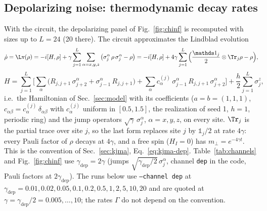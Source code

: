 \subsection{Depolarizing noise: thermodynamic decay rates}
\label{sec:floquet-dep}

With the circuit, the depolarizing panel of Fig.~\ref{fig:chinf} is recomputed with sizes up to $L = 24$ (20 there). The circuit approximates the Lindblad evolution
\begin{equation}
\dot\rho = \Lv(\rho) = -i[H,\rho] + \gamma\sum_{j=1}^{L}\sum_{\alpha = x,y,z}\big(\sigma^\alpha_j\,\rho\,\sigma^\alpha_j - \rho\big)
 = -i[H,\rho] + 4\gamma\sum_{j=1}^{L}\Big(\frac{\mathds 1_j}{2}\otimes\Tr_j\rho - \rho\Big),
\label{eq:floquet-dep}
\end{equation}
\begin{equation}
H = \sum_{j=1}^{L}\Big[\sum_{\alpha}\big(R_{j,j+1}\,\sigma^\alpha_{j+2} + \sigma^\alpha_{j-1}\,R_{j,j+1}\big) + \sum_{\alpha} c^{(j)}_{\alpha}\,\sigma^\alpha_{j-1}\,R_{j,j+1}\,\sigma^\alpha_{j+2}\Big] + \frac h2\sum_{j=1}^{L}\sigma^z_j ,
\label{eq:floquet-dep-H}
\end{equation}
i.e.\ the Hamiltonian of Sec.~\ref{sec:model} with its coefficients ($a = b = (1, 1, 1)$, $c_{\alpha\beta} = c^{(j)}_\alpha\,\delta_{\alpha\beta}$ with $c^{(j)}_\alpha$ uniform in $[0.5, 1.5]$, the realization of seed 1, $h = 1$, periodic ring) and the jump operators $\sqrt\gamma\,\sigma^\alpha_j$, $\alpha = x, y, z$, on every site. $\Tr_j$ is the partial trace over site $j$, so the last form replaces site $j$ by $\mathds 1_j/2$ at rate $4\gamma$: every Pauli factor of $\rho$ decays at $4\gamma$, and a free spin ($H_I = 0$) has $m_\perp = e^{-4\gamma t}$. This is the convention of Sec.~\ref{sec:kjma}, Eq.~\eqref{eq:kjma-dep}. Table~\ref{tab:channels} and Fig.~\ref{fig:chinf} use $\gamma_{\mathrm{dep}} = 2\gamma$ (jumps $\sqrt{\gamma_{\mathrm{dep}}/2}\,\sigma^\alpha_j$, channel \texttt{dep} in the code, Pauli factors at $2\gamma_{\mathrm{dep}}$). The runs below use \texttt{--channel dep} at $\gamma_{\mathrm{dep}} = 0.01, 0.02, 0.05, 0.1, 0.2, 0.5, 1, 2, 5, 10, 20$ and are quoted at $\gamma = \gamma_{\mathrm{dep}}/2 = 0.005, \dots, 10$; the rates $\Gamma$ do not depend on the convention.

